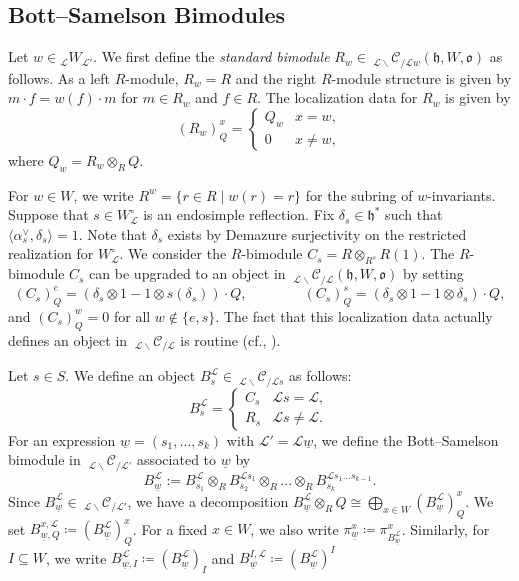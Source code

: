\documentclass{amsart}
\newcommand{\scrL}{\mathcal{L}}
\newcommand{\fr}[1]{\mathfrak{#1}}
\newcommand{\Cmon}[2]{\:_{#1 \backslash} \mathcal{C}_{/ #2} }
\newcommand{\W}[2]{{}_{#1}W_{#2}}
\newcommand{\uw}{\underline{w}}
\theoremstyle{definition}
\numberwithin{equation}{subsection}
\begin{document}
\subsection{Bott--Samelson Bimodules}

Let $w \in \W{\scrL}{\scrL'}$. We first define the \emph{standard bimodule} $R_w \in \Cmon{\scrL}{\scrL w} (\fr{h}, W, \fr{o})$  as follows. As a left $R$-module, $R_w = R$ and the right $R$-module structure is given by $m\cdot f = w(f) \cdot m$ for $m \in R_w$ and $f \in R$.
The localization data for $R_w$ is given by
\[(R_w)_Q^x = \begin{cases} Q_w & x = w, \\ 0 & x \neq w,\end{cases}\]
where $Q_w = R_w \otimes_R Q$.

For $w \in W$, we write $R^w = \{ r \in R \mid w(r) = r \}$ for the subring of $w$-invariants.
Suppose that $s \in W_{\scrL}^\circ$ is an endosimple reflection. Fix $\delta_s \in \fr{h}^*$ such that $\langle \alpha_s^{\vee}, \delta_s \rangle = 1$. Note that $\delta_s$ exists by Demazure surjectivity on the restricted realization for $W_{\scrL}^{\circ}$.
We consider the $R$-bimodule $C_s = R \otimes_{R^s} R(1)$.
The $R$-bimodule $C_s$ can be upgraded to an object in $\Cmon{\scrL}{\scrL} (\fr{h}, W, \fr{o})$ by setting
\begin{equation}\label{eq:localization_of_C_s}
    (C_s)_Q^e = (\delta_s \otimes 1 - 1 \otimes s(\delta_s)) \cdot Q, \qquad\qquad (C_s)_Q^s = (\delta_s \otimes 1 - 1 \otimes \delta_s) \cdot Q,
\end{equation}
and $(C_s)_Q^w = 0$ for all $w \notin \{ e, s\}$. The fact that this localization data actually defines an object in $\Cmon{\scrL}{\scrL}$ is routine (cf., \cite[Claim 3.11]{EW}).

Let $s \in S$. We define an object $B_{s}^{\scrL} \in \Cmon{\scrL}{\scrL s}$ as follows:
\[B_s^{\scrL} = \begin{cases} C_s & \scrL s = \scrL, \\ R_s & \scrL s \neq \scrL.\end{cases}\]
For an expression $\uw = (s_1, \ldots, s_k)$ with $\scrL' = \scrL \uw$, we define the Bott--Samelson bimodule in $\Cmon{\scrL}{\scrL'}$ associated to $\uw$ by
\[ B_{\uw}^{\scrL} := B_{s_1}^{\scrL} \otimes_R B_{s_2}^{\scrL s_1} \otimes_R \ldots \otimes_R B_{s_k}^{\scrL s_1 \ldots s_{k-1}}.\]
Since $B_{\uw}^{\scrL} \in \Cmon{\scrL}{\scrL'} $, we have a decomposition $B_{\uw}^{\scrL} \otimes_R Q \cong \bigoplus_{x \in W}  (B_{\uw}^{\scrL})_Q^x$.
We set $B_{\uw, Q}^{x, \scrL} \coloneq (B_{\uw}^{\scrL})_Q^x$.
For a fixed $x \in W$, we also write $\pi_{\uw}^x \coloneq \pi_{B_{\uw}^{\scrL}}^x$. Similarly, for $I \subseteq W$, we write $B_{\uw, I}^{\scrL} \coloneq (B_{\uw}^{\scrL})_I$ and  $B_{\uw}^{I, \scrL} \coloneq (B_{\uw}^{\scrL})^I$
\end{document}
